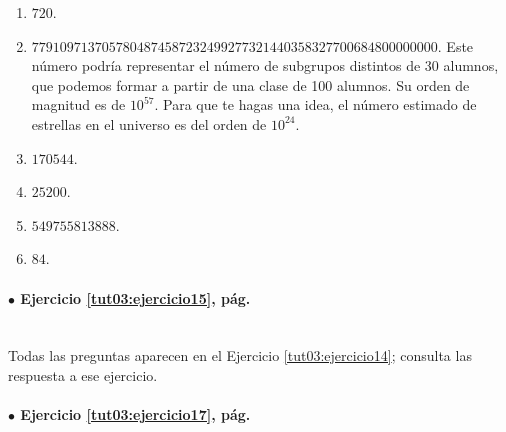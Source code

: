 \documentclass[10pt,a4paper]{article}\usepackage[]{graphicx}\usepackage[]{color}
\begin{document}
\begin{enumerate}
\item $720$.
\item $7791097137057804874587232499277321440358327700684800000000$.
Este número podría representar el número de subgrupos distintos de 30 alumnos, que podemos formar a partir de una clase de 100 alumnos. Su orden de magnitud es de $10^{57}$. Para que te hagas una idea, el número estimado de estrellas en el universo es del orden de $10^{24}$.
\item $170544$.
\item $25200$.
\item $549755813888$.
\item $84$.
\end{enumerate}

\paragraph{\bf $\bullet$ Ejercicio \ref{tut03:ejercicio15}, pág. \pageref{tut03:ejercicio15}}
\label{tut03:ejercicio15:sol}\quad\\

Todas las preguntas aparecen en el Ejercicio \ref{tut03:ejercicio14}; consulta las respuesta a ese ejercicio.


\paragraph{\bf $\bullet$ Ejercicio \ref{tut03:ejercicio17}, pág. \pageref{tut03:ejercicio17}}
\label{tut03:ejercicio17:sol}\quad\\
\end{document}
